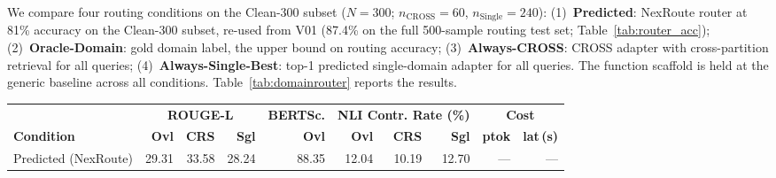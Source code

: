 \documentclass[a4paper,fleql,doubleblind]{cas-sc}
\begin{document}
We compare four routing conditions on the Clean-300 subset
($N{=}300$; $n_{\text{CROSS}}{=}60$, $n_{\text{Single}}{=}240$):
(1)~\textbf{Predicted}: NexRoute router at 81\% accuracy on the Clean-300 subset,
re-used from V01 (87.4\% on the full 500-sample routing test set; Table~\ref{tab:router_acc});
(2)~\textbf{Oracle-Domain}: gold domain label, the upper bound on routing accuracy;
(3)~\textbf{Always-CROSS}: CROSS adapter with cross-partition retrieval for all queries;
(4)~\textbf{Always-Single-Best}: top-1 predicted single-domain adapter for all queries.
The function scaffold is held at the generic baseline across all conditions.
Table~\ref{tab:domainrouter} reports the results.

\vspace{4pt plus 3pt minus 2pt}
\begin{center}
\begingroup
{}
\label{tab:domainrouter}
\setlength{\tabcolsep}{3pt}
\footnotesize
\begin{tabular}{l|rrr|r|rrr|rr}
\toprule
 & \multicolumn{3}{c|}{\textbf{ROUGE-L}}
 & \multicolumn{1}{c|}{\textbf{BERTSc.}}
 & \multicolumn{3}{c|}{\textbf{NLI Contr. Rate (\%)}}
 & \multicolumn{2}{c}{\textbf{Cost}} \\
\cmidrule(lr){2-4}\cmidrule(lr){5-5}\cmidrule(lr){6-8}\cmidrule(l){9-10}
\textbf{Condition}
 & \textbf{Ovl} & \textbf{CRS} & \textbf{Sgl}
 & \textbf{Ovl}
 & \textbf{Ovl} & \textbf{CRS} & \textbf{Sgl}
 & \textbf{ptok} & \textbf{lat\,(s)} \\
\midrule
Predicted (NexRoute)
 & 29.31 & 33.58 & 28.24 & 88.35
 & 12.04 & 10.19 & 12.70 & --- & --- \\

\end{tabular}
\end{center}
\end{document}

